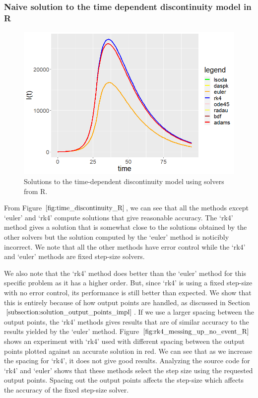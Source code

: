 \subsubsection{Naive solution to the time dependent discontinuity model in R}

\begin{figure}[H]
\centering
\includegraphics[width=0.7\linewidth]{./figures/time_discontinuity_R}
\caption{Solutions to the time-dependent discontinuity model using solvers from R.}
\label{fig:time_discontinuity_R}
\end{figure}

From Figure $\ref{fig:time_discontinuity_R}$, we can see that all the methods except `euler' and `rk4' compute solutions that give reasonable accuracy. The `rk4' method gives a solution that is somewhat close to the solutions obtained by the other solvers but the solution computed by the `euler' method is noticibly incorrect. We note that all the other methods have error control while the `rk4' and `euler' methods are fixed step-size solvers.

We also note that the `rk4' method does better than the `euler' method for this specific problem as it has a higher order. But, since `rk4' is using a fixed step-size with no error control, its performance is still better than expected. We show that this is entirely because of how output points are handled, as discussed in Section $\ref{subsection:solution_output_points_impl}$. If we use a larger spacing between the output points, the `rk4' methods gives results that are of similar accuracy to the results yielded by the  `euler' method. Figure $\ref{fig:rk4_messing_up_no_event_R}$ shows an experiment with `rk4' used with different spacing between the output points plotted against an accurate solution in red. We can see that as we increase the spacing for `rk4', it does not give good results. Analyzing the source code for `rk4' and `euler' \cite{deSolveGithub} shows that these methods select the step size using the requested output points. Spacing out the output points affects the step-size which affects the accuracy of the fixed step-size solver.

